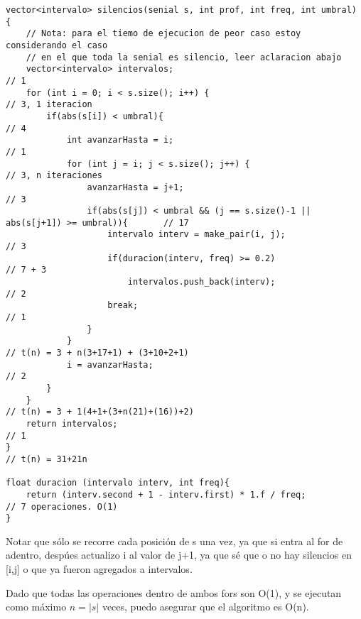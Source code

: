 \documentclass{article}
\begin{document}
\begin{lstlisting}
vector<intervalo> silencios(senial s, int prof, int freq, int umbral) {
    // Nota: para el tiemo de ejecucion de peor caso estoy considerando el caso
    // en el que toda la senial es silencio, leer aclaracion abajo
    vector<intervalo> intervalos;                                                       // 1
    for (int i = 0; i < s.size(); i++) {                                                // 3, 1 iteracion
        if(abs(s[i]) < umbral){                                                         // 4
            int avanzarHasta = i;                                                       // 1
            for (int j = i; j < s.size(); j++) {                                        // 3, n iteraciones
                avanzarHasta = j+1;                                                     // 3
                if(abs(s[j]) < umbral && (j == s.size()-1 || abs(s[j+1]) >= umbral)){       // 17
                    intervalo interv = make_pair(i, j);                                 // 3
                    if(duracion(interv, freq) >= 0.2)                                   // 7 + 3
                        intervalos.push_back(interv);                                   // 2
                    break;                                                              // 1
                }
            }                                                                           // t(n) = 3 + n(3+17+1) + (3+10+2+1)
            i = avanzarHasta;                                                           // 2
        }
    }                                                                                   // t(n) = 3 + 1(4+1+(3+n(21)+(16))+2)
    return intervalos;                                                                  // 1
}                                                                                       // t(n) = 31+21n

float duracion (intervalo interv, int freq){
    return (interv.second + 1 - interv.first) * 1.f / freq;                             // 7 operaciones. O(1)
}
\end{lstlisting}

Notar que sólo se recorre cada posición de s una vez, ya que si entra al for de adentro, despúes actualizo i
al valor de j+1, ya que sé que o no hay silencios en [i,j] o que ya fueron agregados a intervalos.

Dado que todas las operaciones dentro de ambos fors son O(1), y se ejecutan como máximo $n=|s|$ veces, puedo
asegurar que el algoritmo es O(n).
\end{document}
